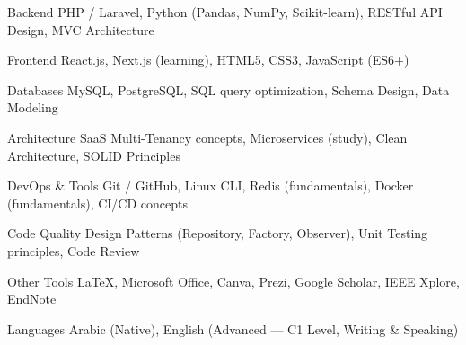 

\begin{cvskills}

  \cvskill
    {Backend}
    {PHP / Laravel, Python (Pandas, NumPy, Scikit-learn), RESTful API Design, MVC Architecture}

  \cvskill
    {Frontend}
    {React.js, Next.js (learning), HTML5, CSS3, JavaScript (ES6+)}

  \cvskill
    {Databases}
    {MySQL, PostgreSQL, SQL query optimization, Schema Design, Data Modeling}

  \cvskill
    {Architecture}
    {SaaS Multi-Tenancy concepts, Microservices (study), Clean Architecture, SOLID Principles}

  \cvskill
    {DevOps \& Tools}
    {Git / GitHub, Linux CLI, Redis (fundamentals), Docker (fundamentals), CI/CD concepts}

  \cvskill
    {Code Quality}
    {Design Patterns (Repository, Factory, Observer), Unit Testing principles, Code Review}

  \cvskill
    {Other Tools}
    {LaTeX, Microsoft Office, Canva, Prezi, Google Scholar, IEEE Xplore, EndNote}

  \cvskill
    {Languages}
    {Arabic (Native), English (Advanced — C1 Level, Writing \& Speaking)}

\end{cvskills}
